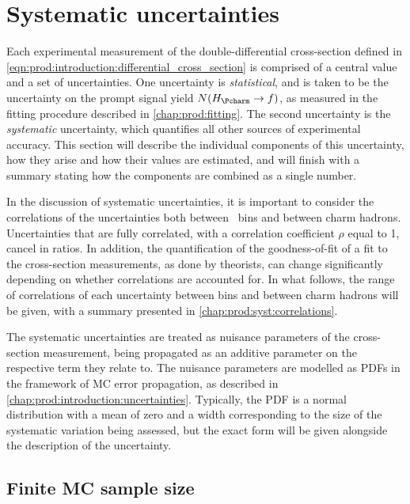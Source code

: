 \chapter{Systematic uncertainties}
\label{chap:prod:syst}

Each experimental measurement of the double-differential cross-section defined 
in \cref{eqn:prod:introduction:differential_cross_section} is comprised of a 
central value and a set of uncertainties.
One uncertainty is \emph{statistical}, and is taken to be the uncertainty on 
the prompt signal yield $N(\HcTof)$, as measured in the fitting procedure 
described in \cref{chap:prod:fitting}.
The second uncertainty is the \emph{systematic} uncertainty, which quantifies 
all other sources of experimental accuracy.
This section will describe the individual components of this uncertainty, how 
they arise and how their values are estimated, and will finish with a summary 
stating how the components are combined as a single number.

In the discussion of systematic uncertainties, it is important to consider the 
correlations of the uncertainties both between \pTy\ bins and between charm 
hadrons.
Uncertainties that are fully correlated, with a correlation coefficient $\rho$ 
equal to 1, cancel in ratios.
In addition, the quantification of the goodness-of-fit of a fit to the 
cross-section measurements, as done by theorists, can change significantly 
depending on whether correlations are accounted for.
In what follows, the range of correlations of each uncertainty between bins and 
between charm hadrons will be given, with a summary presented in 
\cref{chap:prod:syst:correlations}.

The systematic uncertainties are treated as nuisance parameters of the 
cross-section measurement, being propagated as an additive parameter on the 
respective term they relate to.
The nuisance parameters are modelled as \aclp{PDF} in the framework of \acl{MC} 
error propagation, as described in \cref{chap:prod:introduction:uncertainties}.
Typically, the \ac{PDF} is a normal distribution with a mean of zero and a 
width corresponding to the size of the systematic variation being assessed, but 
the exact form will be given alongside the description of the uncertainty.

\section{Finite \acl{MC} sample size}
\label{chap:prod::syst:mcstat}

